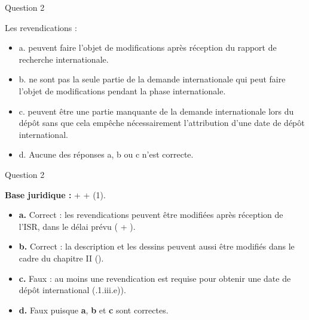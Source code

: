 \begin{frame}{Question 2}

\begin{block}{}
Les revendications :

\begin{itemize}
  \item[$\bullet$] a. peuvent faire l’objet de modifications après réception du rapport de recherche 
  internationale.  
  \item[$\bullet$] b. ne sont pas la seule partie de la demande internationale qui peut faire l’objet de 
  modifications pendant la phase internationale. 
  \item[$\circ$] c. peuvent être une partie manquante de la demande internationale lors du dépôt sans 
  que cela empêche nécessairement l’attribution d’une date de dépôt international. 
  \item[$\circ$] d. Aucune des réponses a, b ou c n’est correcte. 
\end{itemize}

\end{block}

\end{frame}

\begin{frame}{Question 2}

\textbf{Base juridique :}  +  + (1).  

\begin{itemize}
  \item[$\bullet$] \textbf{a.} \; Correct : les revendications peuvent être modifiées après réception de l’ISR,
  dans le délai prévu ( + ).

  \item[$\bullet$] \textbf{b.} \; Correct : la description et les dessins peuvent aussi être modifiés dans le cadre
  du chapitre II ().

  \item[$\bullet$] \textbf{c.} \; Faux : au moins une revendication
est requise pour obtenir une date de dépôt international
(.1.iii.e)).

  \item[$\circ$] \textbf{d.} \; Faux puisque \textbf{a}, \textbf{b} et \textbf{c} sont correctes.
\end{itemize}

\end{frame}
